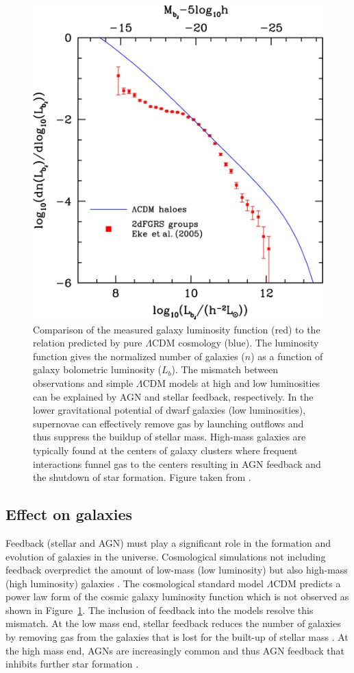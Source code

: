\begin{figure}
	\centering
	\includegraphics[width=0.55\linewidth]{images/chapters/introduction/sf/luminosity_function.pdf}
	\caption[Galaxy luminosity function compared to the $\Lambda$CDM prediction]{Comparison of the measured galaxy luminosity function (red) to the relation predicted by pure $\Lambda$CDM cosmology (blue). The luminosity function gives the normalized number of galaxies ($n$) as a function of galaxy bolometric luminosity ($L_b$). The mismatch between observations and simple $\Lambda$CDM models at high and low luminosities can be explained by AGN and stellar feedback, respectively. In the lower gravitational potential of dwarf galaxies (low luminosities), supernovae can effectively remove gas by launching outflows and thus suppress the buildup of stellar mass. High-mass galaxies are typically found at the centers of galaxy clusters where frequent interactions funnel gas to the centers resulting in AGN feedback and the shutdown of star formation.
	Figure taken from \citet{2006RPPh...69.3101B}.}
	\label{introduction: figure: star formation: luminosity function}
\end{figure}

\subsection{Effect on galaxies}
Feedback (stellar and AGN) must play a significant role in the formation and evolution of galaxies in the universe. Cosmological simulations not including feedback overpredict the amount of low-mass (low luminosity) but also high-mass (high luminosity) galaxies \citep[e.g.][]{2010gfe..book.....M,2013ApJ...770...57B}. The cosmological standard model $\Lambda$CDM predicts a power law form of the cosmic galaxy luminosity function which is not observed as shown in Figure~\ref{introduction: figure: star formation: luminosity function}. The inclusion of feedback into the models resolve this mismatch. At the low mass end, stellar feedback reduces the number of galaxies by removing gas from the galaxies that is lost for the built-up of stellar mass \citep[e.g.][]{1991ApJ...381...14L,2002MNRAS.330..113K}. At the high mass end, AGNs are increasingly common and thus AGN feedback that inhibits further star formation \citep[e.g.][]{2005MNRAS.361..776S,2006MNRAS.370..645B}.


